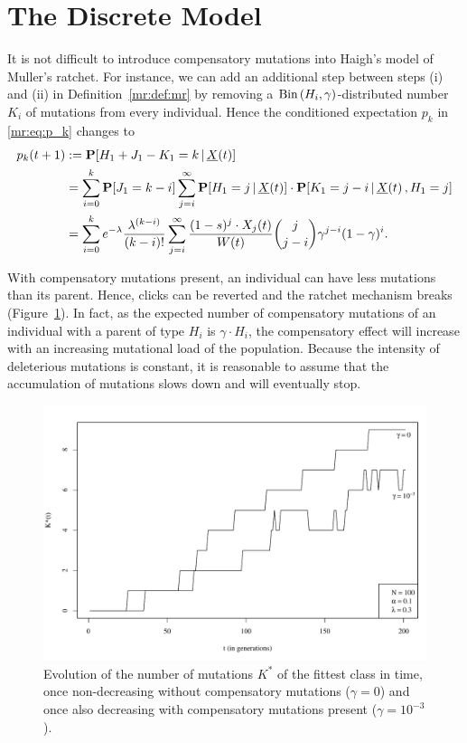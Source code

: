 \section{The Discrete Model}
It is not difficult to introduce compensatory mutations into Haigh's model of Muller's ratchet. For
instance, we can add an additional step between steps (i) and (ii) in
Definition~\ref{mr:def:mr} by removing a $\text{Bin}\left(H_i,\gamma\right)$-distributed number
$K_i$ of mutations from every individual. Hence the conditioned expectation $p_k$ in \eqref{mr:eq:p_k} changes to
\begin{equation*} \label{cm:eq:p_k-def}
\begin{aligned}
p_k(t+1) &:= \CPR{H_1+J_1-K_1=k}{\mrT{t}} \\
&= \sum_{i=0}^k \PR{J_1=k-i} 
	\sum_{j=i}^\infty \CPR{H_1 = j}{\mrT{t}} \cdot \CPR{K_1 =j-i}{\mrT{t},H_1 = j} \\ 
&= \sum_{i=0}^k e^{-\lambda} \frac{\lambda^{(k-i)}}{(k-i)!}
	\sum_{j=i}^\infty \frac{(1-s)^{j} \cdot \mrKT{j}{t}}{W(t)} 
					  \binom{j}{j-i} \gamma^{j-i} (1-\gamma)^{i}.
\end{aligned}
\end{equation*}

\noindent
With compensatory mutations present, an individual can have less mutations than its parent.
Hence, clicks can be reverted and the ratchet mechanism breaks
(Figure~\ref{cm:f:samplepaths}). In fact, as the expected number of compensatory mutations of an individual with a parent of type
$H_i$ is $\gamma \cdot H_i$, the compensatory effect will increase with an increasing mutational
load of the population. Because the intensity of deleterious mutations is constant, it is reasonable
to assume that the accumulation of mutations slows down and will eventually stop.

\begin{figure}[h]
\begin{center}
	\includegraphics[width=12cm]{img/KSamplePaths}
\end{center}
\caption{\label{cm:f:samplepaths} Evolution of the number of mutations $K^*$ of the fittest class
in time, once non-decreasing without compensatory mutations ($\gamma = 0$) and once also
decreasing with compensatory mutations present ($\gamma = 10^{-3}$).}
\end{figure}

